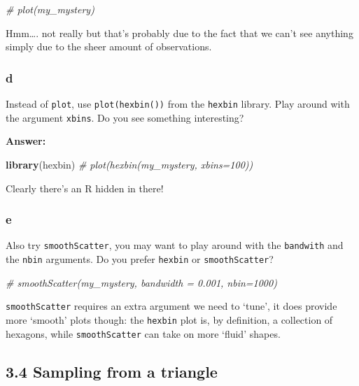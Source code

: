 \documentclass[]{article}
\newenvironment{Shaded}{\begin{snugshade}}{\end{snugshade}}
\newcommand{\CommentTok}[1]{\textcolor[rgb]{0.56,0.35,0.01}{\textit{#1}}}
\newcommand{\KeywordTok}[1]{\textcolor[rgb]{0.13,0.29,0.53}{\textbf{#1}}}
\newcommand{\NormalTok}[1]{#1}
\begin{document}
\begin{Shaded}
\begin{Highlighting}[]
\CommentTok{# plot(my_mystery)}
\end{Highlighting}
\end{Shaded}

Hmm\ldots{}. not really but that's probably due to the fact that we
can't see anything simply due to the sheer amount of observations.

\hypertarget{d-6}{%
\subsubsection{d}\label{d-6}}

Instead of \texttt{plot}, use \texttt{plot(hexbin())} from the
\texttt{hexbin} library. Play around with the argument \texttt{xbins}.
Do you see something interesting?

\textbf{Answer:}

\begin{Shaded}
\begin{Highlighting}[]
\KeywordTok{library}\NormalTok{(hexbin)}
\CommentTok{# plot(hexbin(my_mystery, xbins=100))}
\end{Highlighting}
\end{Shaded}

Clearly there's an R hidden in there!

\hypertarget{e-3}{%
\subsubsection{e}\label{e-3}}

Also try \texttt{smoothScatter}, you may want to play around with the
\texttt{bandwith} and the \texttt{nbin} arguments. Do you prefer
\texttt{hexbin} or \texttt{smoothScatter}?

\begin{Shaded}
\begin{Highlighting}[]
\CommentTok{# smoothScatter(my_mystery, bandwidth = 0.001, nbin=1000)}
\end{Highlighting}
\end{Shaded}

\texttt{smoothScatter} requires an extra argument we need to `tune', it
does provide more `smooth' plots though: the \texttt{hexbin} plot is, by
definition, a collection of hexagons, while \texttt{smoothScatter} can
take on more `fluid' shapes.

\hypertarget{sampling-from-a-triangle}{%
\subsection{3.4 Sampling from a
triangle}\label{sampling-from-a-triangle}}
\end{document}
